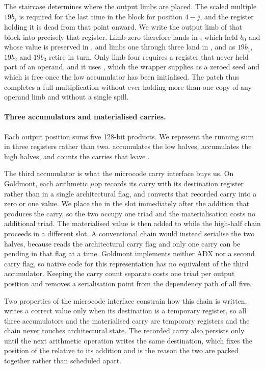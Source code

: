 The staircase determines where the output limbs are placed.
The scaled multiple $19b_j$ is required for the last time in the block for
position $4-j$, and the register holding it is dead from that point onward.
We write the output limb of that block into precisely that register.
Limb zero therefore lands in , which held $b_0$ and whose value is
preserved in , and limbs one through three land in ,
 and  as $19b_1$, $19b_2$ and $19b_3$ retire in turn.
Only limb four requires a register that never held part of an operand, and it
uses , which the wrapper supplies as a zeroed seed and which is free once
the low accumulator has been initialised.
The patch thus completes a full multiplication without ever holding more than one
copy of any operand limb and without a single spill.

\paragraph{Three accumulators and materialised carries.}
Each output position sums five 128-bit products.
We represent the running sum in three registers rather than two.
 accumulates the low halves,  accumulates the high halves, and
 counts the carries that leave .

The third accumulator is what the microcode carry interface buys us.
On Goldmont, each arithmetic $\mu$op records its carry with its destination
register rather than in a single architectural flag, and
 converts that recorded carry into a zero or one value.
We place the  in the slot immediately after the addition that produces
the carry, so the two occupy one triad and the materialisation costs no additional
triad.
The materialised value is then added to  while the high-half chain
proceeds in a different slot.
A conventional  chain would instead serialise the two halves, because
 reads the architectural carry flag and only one carry can be pending in
that flag at a time.
Goldmont implements neither ADX nor a second carry flag, so native code for this
representation has no equivalent of the third accumulator.
Keeping the carry count separate costs one triad per output position and removes a
serialisation point from the dependency path of all five.

Two properties of the microcode interface constrain how this chain is written.
 writes a correct value only when its destination is a
temporary register, so all three accumulators and the materialised carry are
temporary registers and the chain never touches architectural state.
The recorded carry also persists only until the next arithmetic operation writes
the same destination, which fixes the position of the  relative to its
addition and is the reason the two are packed together rather than scheduled
apart.

